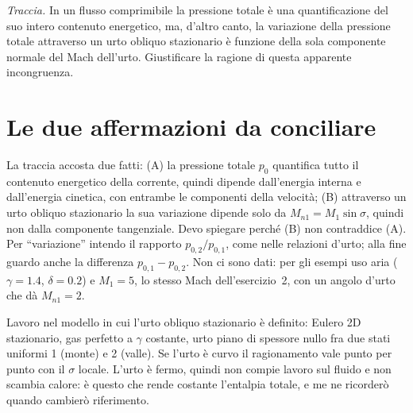 

\graphicspath{{../../svolgimenti/2021-09-14_B65-E03_pressione_totale_urto_obliquo/figure/}}

\newcommand{\Mn}{M_{n1}}
\newcommand{\sth}{s_{\rm th}}
\newcommand{\kk}{\frac{\gamma}{\gamma-1}}



\maketitle

\emph{Traccia.} In un flusso comprimibile la pressione totale è una quantificazione del suo intero contenuto
energetico, ma, d'altro canto, la variazione della pressione totale attraverso un urto obliquo stazionario è
funzione della sola componente normale del Mach dell'urto. Giustificare la ragione di questa apparente incongruenza.

\section*{Le due affermazioni da conciliare}
La traccia accosta due fatti: (A) la pressione totale $p_0$ quantifica tutto il contenuto energetico della corrente,
quindi dipende dall'energia interna e dall'energia cinetica, con entrambe le componenti della velocità; (B)
attraverso un urto obliquo stazionario la sua variazione dipende solo da $\Mn=M_1\sin\sigma$, quindi non dalla
componente tangenziale. Devo spiegare perché (B) non contraddice (A). Per ``variazione'' intendo il rapporto
$p_{0,2}/p_{0,1}$, come nelle relazioni d'urto; alla fine guardo anche la differenza $p_{0,1}-p_{0,2}$. Non ci
sono dati: per gli esempi uso aria ($\gamma=\num{1.4}$, $\delta=\num{0.2}$) e $M_1=5$, lo stesso Mach
dell'esercizio~2, con un angolo d'urto che dà $\Mn=2$.

Lavoro nel modello in cui l'urto obliquo stazionario è definito: Eulero 2D stazionario, gas perfetto a $\gamma$
costante, urto piano di spessore nullo fra due stati uniformi 1 (monte) e 2 (valle). Se l'urto è curvo il
ragionamento vale punto per punto con il $\sigma$ locale. L'urto è fermo, quindi non compie lavoro sul fluido e non
scambia calore: è questo che rende costante l'entalpia totale, e me ne ricorderò quando cambierò riferimento.

